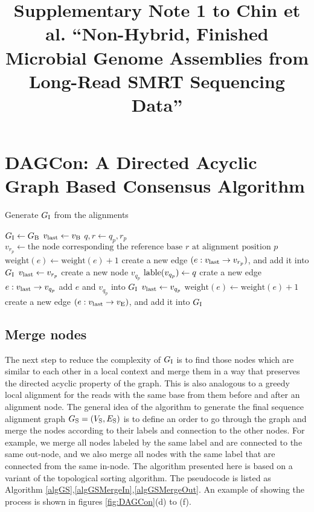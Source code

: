 \documentclass[11pt]{article}
\title{Supplementary Note 1 to Chin et al. ``Non-Hybrid, Finished Microbial Genome Assemblies from Long-Read SMRT Sequencing Data''}
\author{}
\date{}
\begin{document}
\maketitle

\tableofcontents 

\section{DAGCon: A Directed Acyclic Graph Based Consensus Algorithm}

\begin{algorithm}[H]
\caption{Generate $G_{\rm I}$ from the alignments}          
\label{algGI}
\begin{algorithmic}[1]
\State $G_{\rm I}\gets G_{\rm B}$
\State $v_{\rm last} \gets v_{\rm B}$
	\State $q, r \gets q_p, r_p$
		\State $v_{r_p} \gets \textrm{the node corresponding the reference base } r \textrm{ at alignment position } p $
			\State $\textrm{weight}(e) \gets \textrm{weight}(e) + 1$
		\Else
			\State create a new edge $(e: v_{\rm last} \rightarrow v_{r_p})$, and add it into $G_{\rm I}$
		\EndIf
		\State $v_{\rm last} \gets v_{r_p}$
		\State create a new node $v_{q_p}$
		\State ${\rm lable}(v_{q_p}) \gets q$
		\State crate a new edge $e: v_{\rm last} \rightarrow v_{q_p}$
		\State add $e$ and $v_{q_p}$ into $G_{\rm I}$
		\State $v_{\rm last} \gets v_{q_p}$
	\EndIf
		\State $\textrm{weight}(e) \gets \textrm{weight}(e) + 1$
	\Else
		\State create a new edge $(e: v_{\rm last} \rightarrow v_{\rm E})$, and add it into $G_{\rm I}$
	\EndIf	
\EndFor
\end{algorithmic}
\end{algorithm}  

\subsection{Merge nodes}
The next step to reduce the complexity of $G_{\rm I}$ is to find those nodes which are similar to each other in a local context and merge them in a way that preserves the directed acyclic property of the graph.  This is also analogous to a greedy local alignment for the reads with the same base from them before and after an alignment node. The general idea of the algorithm to generate the final sequence alignment graph $G_{\rm S}=(V_{\rm S}, E_{\rm S})$ is to define an order to go through the graph and merge the nodes according to their labels and connection to the other nodes. For example, we merge all nodes labeled by the same label and are connected to the same out-node, and we also merge all nodes with the same label that are connected from the same in-node.  The algorithm presented here is based on a variant of the topological sorting algorithm. The pseudocode is listed as Algorithm \ref{algGS},\ref{algGSMergeIn},\ref{algGSMergeOut}.  An example of showing the process is shown in figures \ref{fig:DAGCon}(d) to (f).
\end{document}

